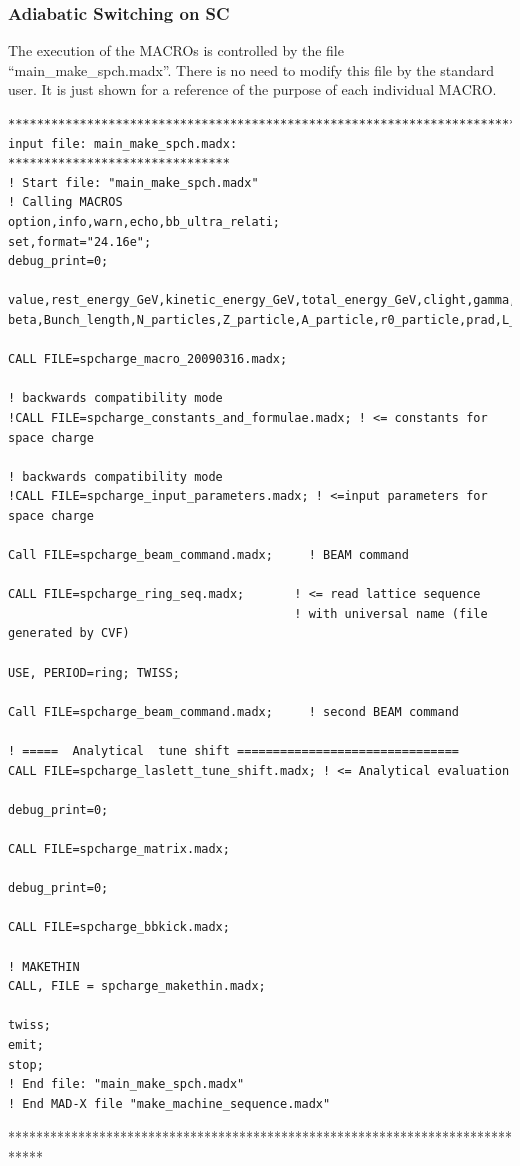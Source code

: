 \subsubsection{Adiabatic Switching on SC}\label{APPENDIX4}
The execution of the MACROs is controlled by the file
``main\_make\_spch.madx''. There is no need to modify this file by
the standard user. It is just shown for a reference of the purpose of
each individual MACRO.
\begin{verbatim}
*****************************************************************************
input file: main_make_spch.madx:
*******************************
! Start file: "main_make_spch.madx"
! Calling MACROS
option,info,warn,echo,bb_ultra_relati;
set,format="24.16e";
debug_print=0;

value,rest_energy_GeV,kinetic_energy_GeV,total_energy_GeV,clight,gamma,
beta,Bunch_length,N_particles,Z_particle,A_particle,r0_particle,prad,L_div_max;

CALL FILE=spcharge_macro_20090316.madx;

! backwards compatibility mode
!CALL FILE=spcharge_constants_and_formulae.madx; ! <= constants for space charge

! backwards compatibility mode
!CALL FILE=spcharge_input_parameters.madx; ! <=input parameters for space charge

Call FILE=spcharge_beam_command.madx;     ! BEAM command

CALL FILE=spcharge_ring_seq.madx;       ! <= read lattice sequence
                                        ! with universal name (file generated by CVF)

USE, PERIOD=ring; TWISS;

Call FILE=spcharge_beam_command.madx;     ! second BEAM command

! =====  Analytical  tune shift ===============================
CALL FILE=spcharge_laslett_tune_shift.madx; ! <= Analytical evaluation 

debug_print=0;

CALL FILE=spcharge_matrix.madx;

debug_print=0;

CALL FILE=spcharge_bbkick.madx;

! MAKETHIN
CALL, FILE = spcharge_makethin.madx;

twiss;
emit;
stop;
! End file: "main_make_spch.madx"
! End MAD-X file "make_machine_sequence.madx"
\end{verbatim}
*****************************************************************************

